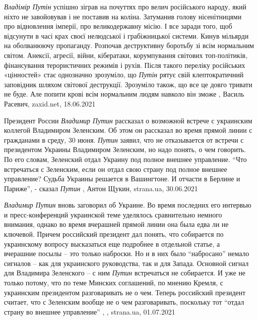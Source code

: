 \emph{Владімір Путін} успішно зіграв на почуттях про велич російського народу, який
ніхто не завойовував і не поставив на коліна. Затуманив голову нісенітницями
про відновлення імперії, про великодержавну місію. І все заради того, щоб
відсунути в часі крах своєї нелюдської і грабіжницької системи. Кинув мільярди
на оболванюючу пропаганду. Розпочав деструктивну боротьбу зі всім нормальним
світом. Анексії, агресії, війни, кібератаки, корумпування світових
топ-політиків, фінансування терористичних режимів і рухів. Після такого
переліку російських «цінностей» стає однозначно зрозуміло, що \emph{Путін} рятує свій
клептократичний заповідник шляхом світової деструкції. Зрозуміло також, що все
це довго тривати не буде. Але попити крові всім нормальним людям навколо він
зможе
, 
Василь Расевич, zaxid.net, 18.06.2021

Президент России \emph{Владимир Путин} рассказал о возможной встрече с
украинским коллегой Владимиром Зеленским. Об этом он рассказал во время прямой
линии с гражданами в среду, 30 июня. \emph{Путин} заявил, что не отказывается
от встречи с президентом Украины Владимиром Зеленским, но надо понять, о чем
говорить. По его словам, Зеленский отдал Украину под полное внешнее управление.
\enquote{Что встречаться с Зеленским, если он отдал свою страну под полное
внешнее управление? Судьба Украины решается в Вашингтоне. И отчасти в Берлине и
Париже}, - сказал \emph{Путин}
, Антон Щукин, strana.ua, 30.06.2021

\emph{Владимир Путин} вновь заговорил об Украине. Во время последних его интервью и
пресс-конференций украинской теме уделялось сравнительно немного внимания,
однако во время вчерашней прямой линии она была едва ли не ключевой. Причем
российский президент дал понять, что собирается по украинскому вопросу
высказаться еще подробнее в отдельной статье, а вчерашние посылы – это только
наброски. Но и в них было \enquote{набросано} немало сигналов – как для украинского
руководства, так и для Запада.  Основной сигнал для Владимира Зеленского – с
ним \emph{Путин} встречаться не собирается. И уже не только потому, что по теме
Минских соглашений, по мнению Кремля, с украинским президентом разговаривать не
о чем. Теперь российский президент считает, что с Зеленским вообще не о чем
разговаривать, поскольку тот \enquote{отдал страну во внешнее управление}
, 
, strana.ua, 01.07.2021
